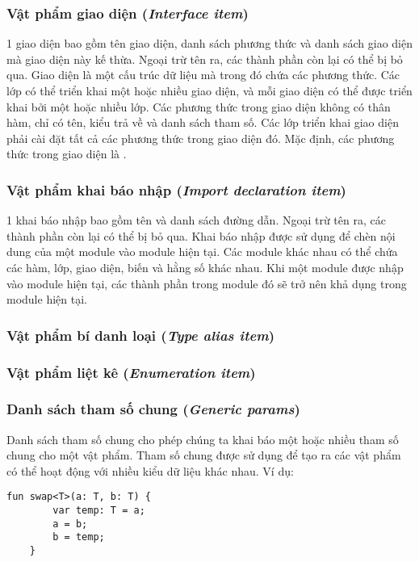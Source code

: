 \subsubsection{Vật phẩm giao diện (\textit{Interface item})}

\regexinterfaceitem

1 giao diện bao gồm tên giao diện, danh sách phương thức và danh sách giao diện mà giao diện này kế thừa. Ngoại trừ tên ra, các thành phần còn lại có thể bị bỏ qua. Giao diện là một cấu trúc dữ liệu mà trong đó chứa các phương thức. Các lớp có thể triển khai một hoặc nhiều giao diện, và mỗi giao diện có thể được triển khai bởi một hoặc nhiều lớp. Các phương thức trong giao diện không có thân hàm, chỉ có tên, kiểu trả về và danh sách tham số. Các lớp triển khai giao diện phải cài đặt tất cả các phương thức trong giao diện đó. Mặc định, các phương thức trong giao diện là .

\subsubsection{Vật phẩm khai báo nhập (\textit{Import declaration item})}

\regeximportitem

1 khai báo nhập bao gồm tên và danh sách đường dẫn. Ngoại trừ tên ra, các thành phần còn lại có thể bị bỏ qua. Khai báo nhập được sử dụng để chèn nội dung của một module vào module hiện tại. Các module khác nhau có thể chứa các hàm, lớp, giao diện, biến và hằng số khác nhau. Khi một module được nhập vào module hiện tại, các thành phần trong module đó sẽ trở nên khả dụng trong module hiện tại.

\subsubsection{Vật phẩm bí danh loại (\textit{Type alias item})}

\subsubsection{Vật phẩm liệt kê (\textit{Enumeration item})}

\subsubsection{Danh sách tham số chung (\textit{Generic params})}

\regexgenparams

Danh sách tham số chung cho phép chúng ta khai báo một hoặc nhiều tham số chung cho một vật phẩm. Tham số chung được sử dụng để tạo ra các vật phẩm có thể hoạt động với nhiều kiểu dữ liệu khác nhau. Ví dụ:

\begin{lstlisting}[]
    fun swap<T>(a: T, b: T) {
        var temp: T = a;
        a = b;
        b = temp;
    }
\end{lstlisting}
